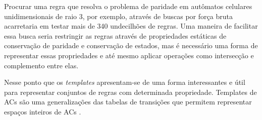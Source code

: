 Procurar uma regra que resolva o problema de paridade em autômatos celulares unidimensionais de raio 3, por exemplo, através de buscas por força bruta acarretaria em testar mais de 340 undecilhões de regras. Uma maneira de facilitar essa busca seria restringir as regras através de propriedades estáticas de conservação de paridade e conservação de estados, mas é necessário uma forma de representar essas propriedades e até mesmo aplicar operações como intersecção e complemento entre elas.

Nesse ponto que os \textit{templates} apresentam-se de uma forma interessantes e útil para representar conjuntos de regras com determinada propriedade. Templates de ACs são uma generalizações das tabelas de transições que permitem representar espaços inteiros de ACs \cite{daCosta2014}.

